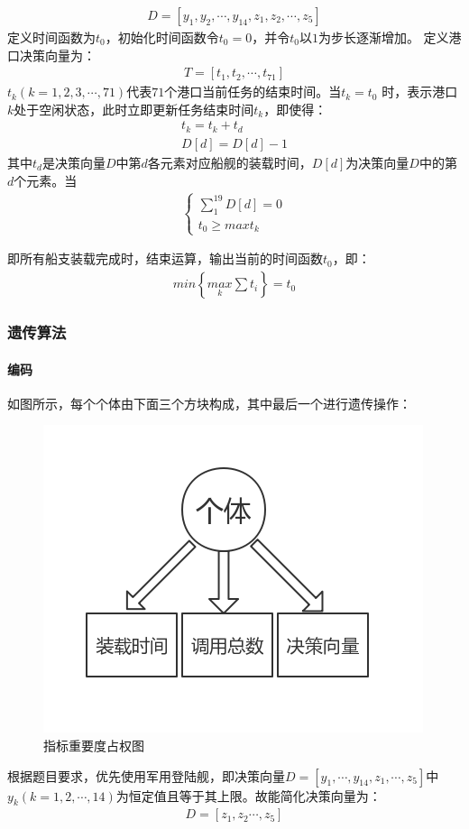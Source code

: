 \documentclass{whutmod}
\begin{document}
		\begin{gather*}
	 D=[y_{1},y_{2},\cdots,y_{14},z_{1},z_{2},\cdots,z_{5}]
		\end{gather*}
	定义时间函数为$t_{0}$，初始化时间函数令$t_{0}=0$，并令$t_{0}$以$1$为步长逐渐增加。
	定义港口决策向量为：
		\begin{gather*}
		T=[t_{1},t_{2},\cdots,t_{71}]
		\end{gather*}
	$t_{k}(k=1,2,3,\cdots,71)$代表$71$个港口当前任务的结束时间。当$t_{k}=t_{0}$ 时，表示港口$k$处于空闲状态，此时立即更新任务结束时间$t_{k}$，即使得：
		\begin{gather*}
		t_{k}=t_{k}+t_{d}\\
		D[d]=D[d]-1
		\end{gather*}
	其中$t_{d}$是决策向量$D$中第$d$各元素对应船舰的装载时间，$D[d]$为决策向量$D$中的第$d$个元素。当
		\begin{gather*}
	\left\{\begin{matrix} \sum_{1}^{19}D[d]=0
	\\t_{0}\geqslant max t_{k} 	
	\end{matrix}\right.
		\end{gather*}

		即所有船支装载完成时，结束运算，输出当前的时间函数$t_{0}$，即：
			\begin{gather*}
		min \left \{ \underset{k}{max}\sum t_{i} \right \}=t_{0}
			\end{gather*}

	\subsubsection{遗传算法}
	 \paragraph{编码}
	 如图所示，每个个体由下面三个方块构成，其中最后一个进行遗传操作：
	 	\begin{figure}[H]
	 	\centering
	 	\includegraphics[width=.5\textwidth]{figures/yichuan.jpg}
	 	\caption{指标重要度占权图}\label{yichuan}
	 	 \end{figure}
	 根据题目要求，优先使用军用登陆舰，即决策向量$D=[y_{1},\cdots,y_{14},z_{1},\cdots,z_{5}]$中$y_{k}(k=1,2,\cdots,14)$为恒定值且等于其上限。故能简化决策向量为：
	\begin{gather*}
	D=[z_{1},z_{2}\cdots,z_{5}]
	\end{gather*}
\end{document}
